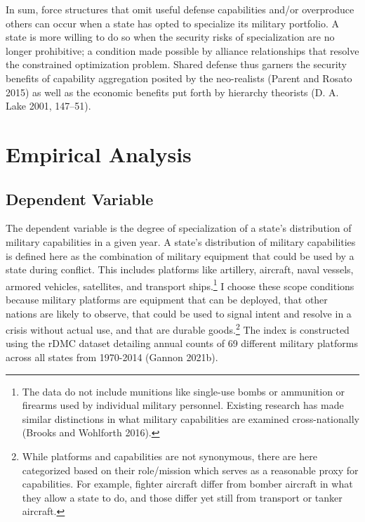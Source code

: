 \documentclass[
  12,
  letterpaper,
  DIV=11,
  numbers=noendperiod]{scrartcl}
\begin{document}
In sum, force structures that omit useful defense capabilities and/or
overproduce others can occur when a state has opted to specialize its
military portfolio. A state is more willing to do so when the security
risks of specialization are no longer prohibitive; a condition made
possible by alliance relationships that resolve the constrained
optimization problem. Shared defense thus garners the security benefits
of capability aggregation posited by the neo-realists (Parent and Rosato
2015) as well as the economic benefits put forth by hierarchy theorists
(D. A. Lake 2001, 147--51).

\hypertarget{sec-empirics}{%
\section{Empirical Analysis}\label{sec-empirics}}

\hypertarget{dependent-variable}{%
\subsection{Dependent Variable}\label{dependent-variable}}

The dependent variable is the degree of specialization of a state's
distribution of military capabilities in a given year. A state's
distribution of military capabilities is defined here as the combination
of military equipment that could be used by a state during conflict.
This includes platforms like artillery, aircraft, naval vessels, armored
vehicles, satellites, and transport ships.\footnote{The data do not
  include munitions like single-use bombs or ammunition or firearms used
  by individual military personnel. Existing research has made similar
  distinctions in what military capabilities are examined
  cross-nationally (Brooks and Wohlforth 2016).} I choose these scope
conditions because military platforms are equipment that can be
deployed, that other nations are likely to observe, that could be used
to signal intent and resolve in a crisis without actual use, and that
are durable goods.\footnote{While platforms and capabilities are not
  synonymous, there are here categorized based on their role/mission
  which serves as a reasonable proxy for capabilities. For example,
  fighter aircraft differ from bomber aircraft in what they allow a
  state to do, and those differ yet still from transport or tanker
  aircraft.} The index is constructed using the rDMC dataset detailing
annual counts of 69 different military platforms across all states from
1970-2014 (Gannon 2021b).
\end{document}
